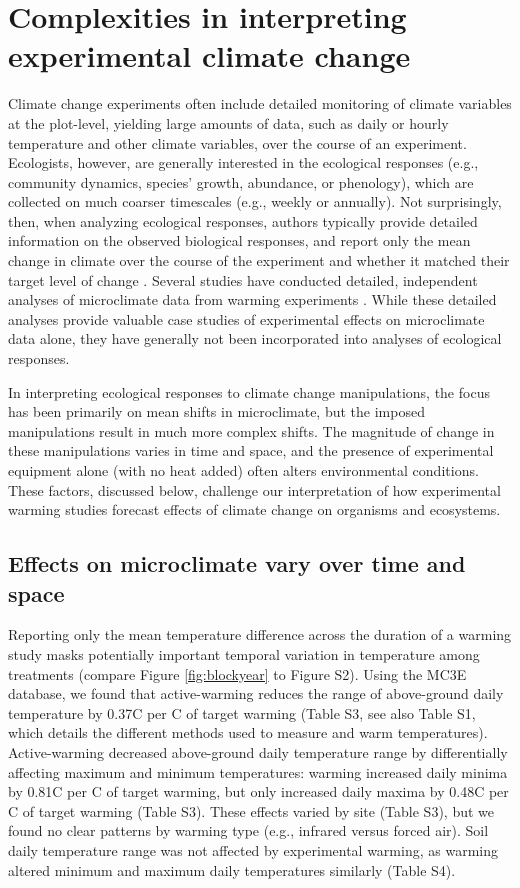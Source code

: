 \documentclass{article}
\begin{document}
\section* {Complexities in interpreting experimental climate change} 
Climate change experiments often include detailed monitoring of climate variables at the plot-level, yielding large amounts of data, such as daily or hourly temperature and other climate variables, over the course of an experiment. Ecologists, however, are generally interested in the ecological responses (e.g., community dynamics, species' growth, abundance, or phenology), which are collected on much coarser timescales (e.g., weekly or annually). Not surprisingly, then, when analyzing ecological responses, authors typically provide detailed information on the observed biological responses, and report only the mean change in climate over the course of the experiment and whether it matched their target level of change \citep[e.g.,][]{price1998,rollinson2012,clark2014a,clark2014b}. Several studies have conducted detailed, independent analyses of microclimate data from warming experiments \citep[e.g.,][]{harte1995b,kimball2005,kimball2008,mcdaniel2014, pelini2011}. While these detailed analyses provide valuable case studies of experimental effects on microclimate data alone, they have generally not been incorporated into analyses of ecological responses. 

\par In interpreting ecological responses to climate change manipulations, the focus  has been primarily on mean shifts in microclimate, but the imposed manipulations result in much more complex shifts. The magnitude of change in these manipulations varies in time and space, and the presence of experimental equipment alone (with no heat added) often alters environmental conditions.  These factors, discussed below, challenge our interpretation of how experimental warming studies forecast effects of climate change on organisms and ecosystems.

\subsection* {Effects on microclimate vary over time and space}
Reporting only the mean temperature difference across the duration of a warming study masks potentially important temporal variation in temperature among treatments (compare Figure \ref{fig:blockyear} to Figure S2). Using the MC3E database, we found that active-warming reduces the range of above-ground daily temperature by 0.37\degree C per \degree C of target warming (Table S3, see also Table S1, which details the different methods used to measure and warm temperatures). Active-warming decreased above-ground daily temperature range by differentially affecting maximum and minimum temperatures: warming increased daily minima by 0.81\degree C per \degree C of target warming, but only increased daily maxima by 0.48\degree C per \degree C of target warming (Table S3). These effects varied by site (Table S3), but we found no clear patterns by warming type (e.g., infrared versus forced air). Soil daily temperature range was not affected by experimental warming, as warming altered minimum and maximum daily temperatures similarly (Table S4).
\end{document}
